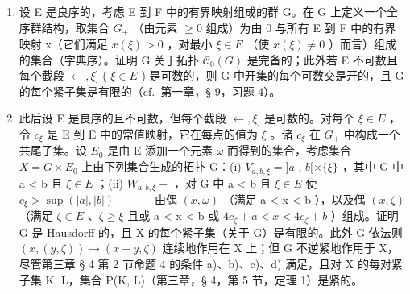 \begin{enumerate}
\def\labelenumi{\alph{enumi})}
\setcounter{enumi}{1}
\item
  设 E 是良序的，考虑 E 到 F 中的有界映射组成的群 G。在 G 上定义一个全序群结构，取集合 \(G_{+}\) （由元素 \(\geqslant0\) 组成）为由 0 与所有 E 到 F 中的有界映射 x（它们满足 \(x(\xi)>0\) ，对最小 \(\xi\in E\) （使 \(x(\xi)\neq0\) ）而言）组成的集合（字典序）。证明 G 关于拓扑 \(\mathcal{C}_{0}(G)\) 是完备的；此外若 E 不可数且每个截段 \(\leftarrow,\xi]\) ( \(\xi\in E\) ) 是可数的，则 G 中开集的每个可数交是开的，且 G 的每个紧子集是有限的（cf.~第一章，§ 9，习题 4）。
\item
  此后设 E 是良序的且不可数，但每个截段 \(\leftarrow,\xi]\) 是可数的。对每个 \(\xi\in E\) ，令 \(c_{\xi}\) 是 E 到 E 中的常值映射，它在每点的值为 \(\xi\) 。诸 \(c_{\xi}\) 在 \(G_{+}\) 中构成一个共尾子集。设 \(E_{0}\) 是由 E 添加一个元素 \(\omega\) 而得到的集合，考虑集合 \(X=G\times E_{0}\) 上由下列集合生成的拓扑 G：(i) \(V_{a,b,\xi} = ]a\) , \(b[\times\{\xi\}\) ，其中 G 中 a \textless{} b 且 \(\xi\in E\) ；(ii) \(W_{a,b,\xi} -\) ，对 G 中 a \textless{} b 且 \(\xi\in E\) 使 \(c_{\xi} > \sup(|a|, |b|) -\) ——由偶 \((x, \omega)\) （满足 a \textless{} x \textless{} b ），以及偶 \((x, \zeta)\) （满足 \(\zeta\in E\) 、\(\zeta \geqslant \xi\) 且或 a \textless{} x \textless{} b 或 \(4c_{\zeta} + a < x < 4c_{\zeta} + b\) ）组成。证明 G 是 Hausdorff 的，且 X 的每个紧子集（关于 G）是有限的。此外 G 依法则 \((x, (y, \zeta)) \to (x + y, \zeta)\) 连续地作用在 X 上；但 G 不逆紧地作用于 X，尽管第三章 § 4 第 2 节命题 4 的条件 a)、b)、c)、d) 满足，且对 X 的每对紧子集 K, L，集合 P(K, L)（第三章，§ 4，第 5 节，定理 1）是紧的。
\end{enumerate}
